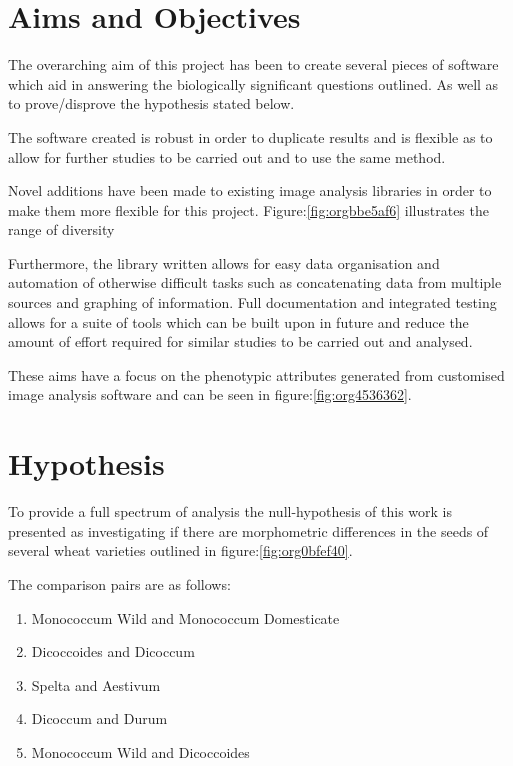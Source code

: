 \documentclass[11pt]{report}
\begin{document}
\section{Aims and Objectives}
\label{sec:orgbd1a578}

The overarching aim of this project has been to create several pieces of software which aid in answering the biologically significant questions outlined. As well as to prove/disprove the hypothesis stated below.

The software created is robust in order to duplicate results and is flexible as to allow for further studies to be carried out and to use the same method.

Novel additions have been made to existing image analysis libraries in order to make them more flexible for this project. Figure:\ref{fig:orgbbe5af6} illustrates the range of diversity

Furthermore, the library written allows for easy data organisation and automation of otherwise difficult tasks such as concatenating data from multiple sources and graphing of information. Full documentation and integrated testing allows for a suite of tools which can be built upon in future and reduce the amount of effort required for similar studies to be carried out and analysed.

These aims have a focus on the phenotypic attributes generated from customised image analysis software \cite{Hughes2017} and can be seen in figure:\ref{fig:org4536362}.

\section{Hypothesis}
\label{sec:orgac23d13}
To provide a full spectrum of analysis the null-hypothesis of this work is presented as investigating if there are morphometric differences in the seeds of several wheat varieties outlined in figure:\ref{fig:org0bfef40}.

The comparison pairs are as follows:

\begin{enumerate}
\item Monococcum Wild and Monococcum Domesticate
\item Dicoccoides and Dicoccum
\item Spelta and Aestivum
\item Dicoccum and Durum
\item Monococcum Wild and Dicoccoides
\end{enumerate}
\end{document}
